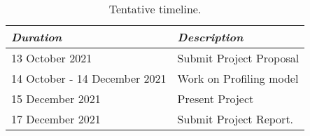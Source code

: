 \begin{table}[h!]
	\centering
	\begin{tabular}{lp{4.7in}}
		\toprule

		{\em Duration} & {\em Description} \\\midrule

		13 October 2021 & Submit Project Proposal  \\\midrule
%
		14 October - 14 December 2021 & Work on Profiling model \\\midrule

		15 December 2021 & Present Project \\\midrule

		17 December 2021 & Submit Project Report. \\ \bottomrule

	\end{tabular}
	\caption{Tentative timeline.}
	\label{tbl:timeline}
\end{table}


